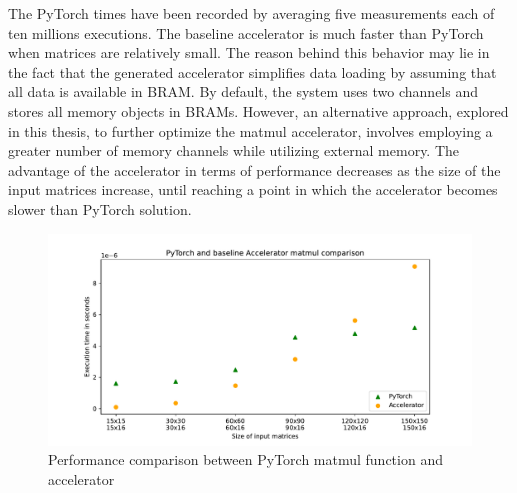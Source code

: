 The PyTorch times have been recorded by averaging five measurements each of ten millions executions.
The baseline accelerator is much faster than PyTorch when matrices are relatively small.
The reason behind this behavior may lie in the fact that the generated accelerator simplifies data loading by assuming that all data is available in BRAM. By default, the system uses two channels and stores all memory objects in BRAMs.
However, an alternative approach, explored in this thesis, to further optimize the matmul accelerator, involves employing a greater number of memory channels while utilizing external memory.
The advantage of the accelerator in terms of performance decreases as the size of the input matrices increase, until reaching a point in which the accelerator becomes slower than PyTorch solution.


\begin{figure}[t]
    \centering
    \includegraphics[height=0.4\textwidth]{Images/matmul_comparison}
    \caption{Performance comparison between PyTorch matmul function and accelerator}
    \label{fig:pytorch-accelerator-comparison}
\end{figure}

